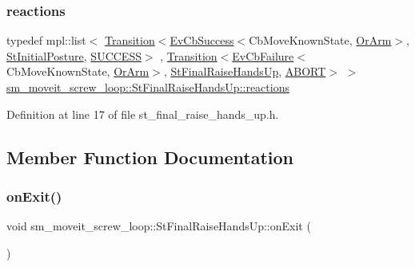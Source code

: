 \subsubsection{\texorpdfstring{reactions}{reactions}}
{\footnotesize\ttfamily typedef mpl\+::list$<$ \hyperlink{classsmacc_1_1Transition}{Transition}$<$\hyperlink{structsmacc_1_1EvCbSuccess}{Ev\+Cb\+Success}$<$Cb\+Move\+Known\+State, \hyperlink{classsm__moveit__screw__loop_1_1OrArm}{Or\+Arm}$>$, \hyperlink{structsm__moveit__screw__loop_1_1StInitialPosture}{St\+Initial\+Posture}, \hyperlink{structsmacc_1_1default__transition__tags_1_1SUCCESS}{S\+U\+C\+C\+E\+SS}$>$ , \hyperlink{classsmacc_1_1Transition}{Transition}$<$\hyperlink{structsmacc_1_1EvCbFailure}{Ev\+Cb\+Failure}$<$Cb\+Move\+Known\+State, \hyperlink{classsm__moveit__screw__loop_1_1OrArm}{Or\+Arm}$>$, \hyperlink{structsm__moveit__screw__loop_1_1StFinalRaiseHandsUp}{St\+Final\+Raise\+Hands\+Up}, \hyperlink{structsmacc_1_1default__transition__tags_1_1ABORT}{A\+B\+O\+RT}$>$ $>$ \hyperlink{structsm__moveit__screw__loop_1_1StFinalRaiseHandsUp_a87eec609dc99aa047838394a64e4651b}{sm\+\_\+moveit\+\_\+screw\+\_\+loop\+::\+St\+Final\+Raise\+Hands\+Up\+::reactions}}



Definition at line 17 of file st\+\_\+final\+\_\+raise\+\_\+hands\+\_\+up.\+h.



\subsection{Member Function Documentation}
\mbox{\label{structsm__moveit__screw__loop_1_1StFinalRaiseHandsUp_a24a99f204f2567b1cef71bdabadc2c12}} 
\subsubsection{\texorpdfstring{on\+Exit()}{onExit()}}
{\footnotesize\ttfamily void sm\+\_\+moveit\+\_\+screw\+\_\+loop\+::\+St\+Final\+Raise\+Hands\+Up\+::on\+Exit (\begin{DoxyParamCaption}\item[{\hyperlink{structsmacc_1_1default__transition__tags_1_1ABORT}{A\+B\+O\+RT}}]{ }\end{DoxyParamCaption})\hspace{0.3cm}{\ttfamily [inline]}}



